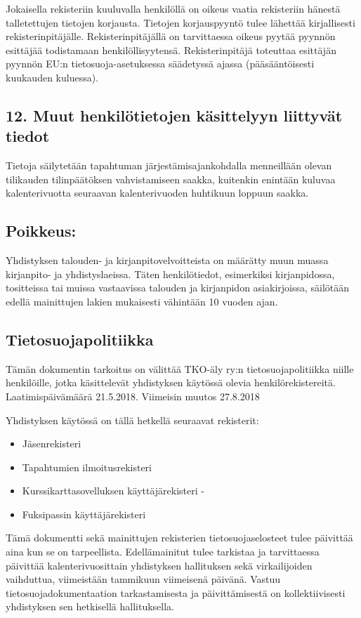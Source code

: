 \documentclass[finnish]{tktltiki}
\begin{document}
Jokaisella rekisteriin kuuluvalla henkilöllä on oikeus vaatia rekisteriin hänestä talletettujen tietojen korjausta. Tietojen korjauspyyntö tulee lähettää kirjallisesti rekisterinpitäjälle. Rekisterinpitäjällä on tarvittaessa oikeus pyytää pyynnön esittäjää todistamaan henkilöllisyytensä. Rekisterinpitäjä toteuttaa esittäjän pyynnön EU:n tietosuoja-asetuksessa säädetyssä ajassa (pääsääntöisesti kuukauden kuluessa).

\subsection*{12. Muut henkilötietojen käsittelyyn liittyvät tiedot}

Tietoja säilytetään tapahtuman järjestämisajankohdalla menneillään olevan tilikauden tilinpäätöksen vahvistamiseen saakka, kuitenkin enintään kuluvaa kalenterivuotta seuraavan kalenterivuoden huhtikuun loppuun saakka.

\subsection*{Poikkeus:}

Yhdistyksen talouden- ja kirjanpitovelvoitteista on määrätty muun muassa kirjanpito- ja yhdistyslaeissa. Täten henkilötiedot, esimerkiksi kirjanpidossa, tositteissa tai muissa vastaavissa talouden ja kirjanpidon asiakirjoissa, säilötään edellä mainittujen lakien mukaisesti vähintään 10 vuoden ajan.


\pagestyle{empty}


\subsection*{Tietosuojapolitiikka}
Tämän dokumentin tarkoitus on välittää TKO-äly ry:n tietosuojapolitiikka niille henkilöille, jotka käsittelevät yhdistyksen käytössä olevia henkilörekistereitä. Laatimispäivämäärä 21.5.2018. Viimeisin muutos 27.8.2018

Yhdistyksen käytössä on tällä hetkellä seuraavat rekisterit:

\begin{itemize}
\item Jäsenrekisteri  
\item Tapahtumien ilmoitusrekisteri
\item Kurssikarttasovelluksen käyttäjärekisteri
-\item Fuksipassin käyttäjärekisteri
\end{itemize}
Tämä dokumentti sekä mainittujen rekisterien tietosuojaselosteet tulee päivittää aina kun se on tarpeellista. Edellämainitut tulee tarkistaa ja tarvittaessa päivittää kalenterivuosittain yhdistyksen hallituksen sekä virkailijoiden vaihduttua, viimeistään tammikuun viimeisenä päivänä. Vastuu tietosuojadokumentaation tarkastamisesta ja päivittämisestä on kollektiivisesti yhdistyksen sen hetkisellä hallituksella.
\end{document}
